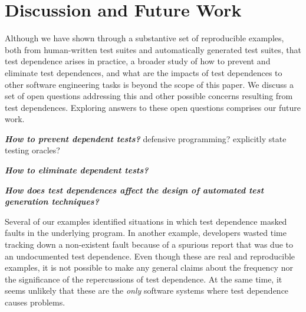 \section{Discussion and Future Work}
\label{sec:discussion}



Although we have shown through a substantive set of reproducible examples,
both from human-written test suites and
automatically generated test suites, that test dependence
arises in practice, a broader
study of how to prevent and eliminate test dependences, and
what are the impacts of test dependences to other software engineering
tasks is beyond the scope of this paper. 
We discuss a set of open questions addressing this and
other possible concerns resulting from test dependences. 
Exploring answers to these open questions comprises
our future work.




\vspace{1mm}

\noindent \textbf{\textit{How to prevent dependent tests?}}
defensive programming? explicitly state testing oracles?

\vspace{1mm}

\noindent \textbf{\textit{How to eliminate dependent tests?}}

\vspace{1mm}

\noindent \textbf{\textit{How does test dependences
affect the design of automated test generation
techniques?}}

Several of our examples identified situations in which test dependence
masked faults in the underlying program. 
In another example, developers wasted time tracking down a non-existent
fault because of a spurious report that was due to an undocumented
test dependence.
Even though these
are real and reproducible examples, it is not possible to make any
general claims about the frequency nor the significance of the
repercussions of test dependence.  At the same time, it seems unlikely
that these are the \emph{only} software systems where test dependence
causes problems.



